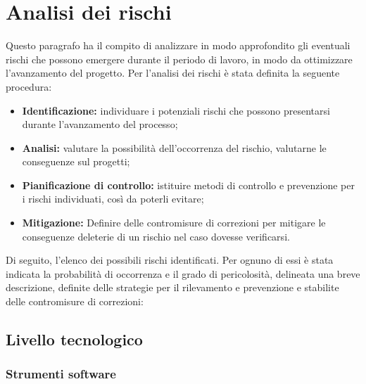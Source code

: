 
\section{Analisi dei rischi}
Questo paragrafo ha il compito di analizzare in modo approfondito gli eventuali rischi che possono emergere durante il periodo di lavoro, in modo da ottimizzare l'avanzamento del progetto. Per l'analisi dei rischi è stata definita la seguente procedura:

\begin{itemize}
\item \textbf{Identificazione:} individuare i potenziali rischi che possono presentarsi durante l'avanzamento del processo;
\item \textbf{Analisi:} valutare la possibilità dell'occorrenza del rischio, valutarne le conseguenze sul progetti;
\item \textbf{Pianificazione di controllo:} istituire metodi di controllo e prevenzione per i rischi individuati, così da poterli evitare;
\item \textbf{Mitigazione:} Definire delle contromisure di correzioni per mitigare le conseguenze deleterie di un rischio nel caso dovesse verificarsi. 
\end{itemize}

Di seguito, l'elenco dei possibili rischi identificati. Per ognuno di essi è stata indicata la probabilità di occorrenza e il grado di pericolosità, delineata una breve descrizione, definite delle strategie per il rilevamento e prevenzione e stabilite delle contromisure di correzioni: 

\subsection{Livello tecnologico}

\hypertarget{subsubsect:software}{}
\subsubsection{Strumenti software}

